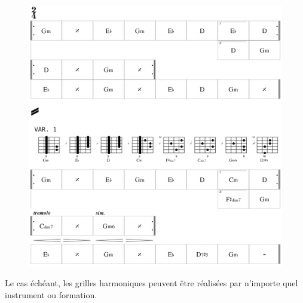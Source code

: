  \begin{figure}[H]
\begin{center}
\includegraphics[scale=0.33]{img/dlc2}
\end{center}
\end{figure}
Le cas \'{e}ch\'{e}ant, les grilles harmoniques peuvent \^{e}tre r\'{e}alis\'{e}es par n'importe quel instrument ou formation.
 
